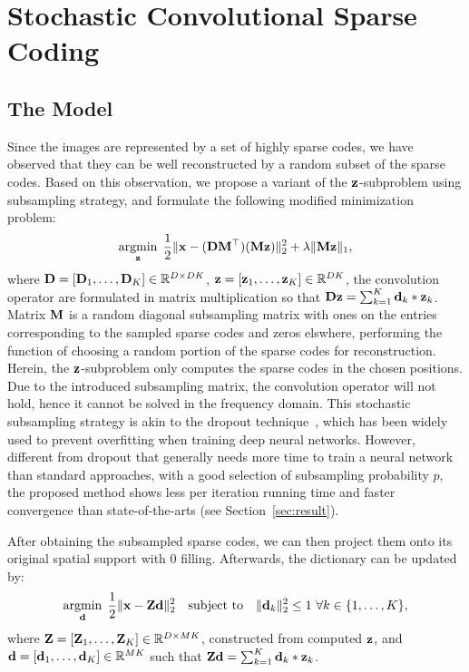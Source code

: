 \section{Stochastic Convolutional Sparse Coding}
\subsection{The Model}
Since the images are represented by a set of highly sparse codes, we have observed that they can be well reconstructed by a random subset of the sparse codes. Based on this observation, we propose a variant of the $\code$-subproblem using subsampling strategy, and formulate the following modified minimization problem:
\begin{equation} \label{eq:updatingCode}
    \minimize{\code} \frac{1}{2}\|\signal - (\Filter \mask^\top)(\mask \code) \|_2^2 + \lambda \|\mask \code\|_1,
\end{equation}
where $\Filter = [\Filter_1, \dots, \Filter_K] \in \mathbb{R}^{D \times DK}$, $\code = [\code_1, \dots, \code_K] \in \mathbb{R}^{DK}$, the convolution operator are formulated in matrix multiplication so that $ \Filter \code = \sum_{k=1}^{K} \filter_k * \code_k$.  Matrix $\mask$ is a random diagonal subsampling  matrix with ones on the entries corresponding to the sampled sparse codes and zeros elswhere, performing the function of choosing a random portion of the sparse codes for reconstruction. Herein, the $\code$-subproblem only computes the sparse codes in the chosen positions. Due to the introduced subsampling matrix, the convolution operator will not hold, hence it cannot be solved in the frequency domain. This stochastic subsampling strategy is akin to the dropout technique~\cite{srivastava2014dropout}, which has been widely used to prevent overfitting when training deep neural networks. However, different from dropout that generally needs more time to train a neural network than standard approaches, with a good selection of subsampling probability $p$, the proposed method shows less per iteration running time and faster convergence than state-of-the-arts (see Section~\ref{sec:result}).

After obtaining the subsampled sparse codes, we can then project them onto its original spatial support with $0$ filling. Afterwards, the dictionary can be updated by:
\begin{equation} \label{eq:updatingFilter}
    \minimize{\filter} \frac{1}{2}\|\signal - \Code \filter \|_2^2 \quad \text{subject to} \quad \|\filter_k\|^2_2 \leq 1 ~ \forall k \in \{1,\dots,K\},
\end{equation}
where $\Code= [\Code_1, \dots, \Code_K] \in \mathbb{R}^{D \times MK}$, constructed from computed $\code$, and $\filter= [\filter_1,\dots,\filter_K] \in \mathbb{R}^{MK}$ such that $ \Code \filter = \sum_{k=1}^{K} \filter_k * \code_k$.

